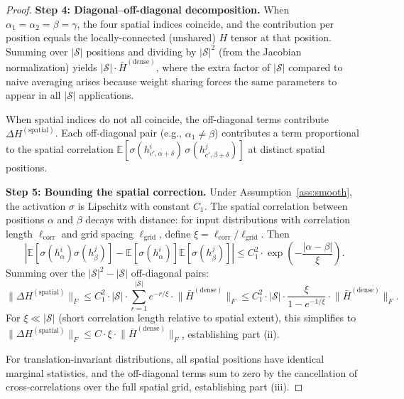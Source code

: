 \documentclass[11pt]{article}
\theoremstyle{definition}
\newcommand{\E}{\mathbb{E}}
\newcommand{\cS}{\mathcal{S}}
\newcommand{\norm}[1]{\lVert #1 \rVert}
\begin{document}
\begin{proof}
\textbf{Step 4: Diagonal--off-diagonal decomposition.} When $\alpha_1 = \alpha_2 = \beta = \gamma$, the four spatial indices coincide, and the contribution per position equals the locally-connected (unshared) $H$ tensor at that position. Summing over $|\cS|$ positions and dividing by $|\cS|^2$ (from the Jacobian normalization) yields $|\cS| \cdot \bar{H}^{(\mathrm{dense})}$, where the extra factor of $|\cS|$ compared to naive averaging arises because weight sharing forces the same parameters to appear in all $|\cS|$ applications.

When spatial indices do not all coincide, the off-diagonal terms contribute $\Delta H^{(\mathrm{spatial})}$. Each off-diagonal pair (e.g., $\alpha_1 \neq \beta$) contributes a term proportional to the spatial correlation $\E[\sigma(h_{c',\alpha+\delta}^i)\,\sigma(h_{c',\beta+\delta}^j)]$ at distinct spatial positions.

\textbf{Step 5: Bounding the spatial correction.} Under Assumption~\ref{ass:smooth}, the activation $\sigma$ is Lipschitz with constant $C_1$. The spatial correlation between positions $\alpha$ and $\beta$ decays with distance: for input distributions with correlation length $\ell_{\mathrm{corr}}$ and grid spacing $\ell_{\mathrm{grid}}$, define $\xi = \ell_{\mathrm{corr}}/\ell_{\mathrm{grid}}$. Then
\begin{equation}
\left|\E[\sigma(h_\alpha^i)\sigma(h_\beta^j)] - \E[\sigma(h_\alpha^i)]\E[\sigma(h_\beta^j)]\right| \le C_1^2 \cdot \exp\!\left(-\frac{|\alpha - \beta|}{\xi}\right).
\end{equation}
Summing over the $|\cS|^2 - |\cS|$ off-diagonal pairs:
\begin{equation}
\norm{\Delta H^{(\mathrm{spatial})}}_F \le C_1^2 \cdot |\cS| \cdot \sum_{r=1}^{|\cS|} e^{-r/\xi} \cdot \norm{\bar{H}^{(\mathrm{dense})}}_F \le C_1^2 \cdot |\cS| \cdot \frac{\xi}{1 - e^{-1/\xi}} \cdot \norm{\bar{H}^{(\mathrm{dense})}}_F.
\end{equation}
For $\xi \ll |\cS|$ (short correlation length relative to spatial extent), this simplifies to $\norm{\Delta H^{(\mathrm{spatial})}}_F \le C \cdot \xi \cdot \norm{\bar{H}^{(\mathrm{dense})}}_F$, establishing part (ii).

For translation-invariant distributions, all spatial positions have identical marginal statistics, and the off-diagonal terms sum to zero by the cancellation of cross-correlations over the full spatial grid, establishing part (iii).
\end{proof}
\end{document}
